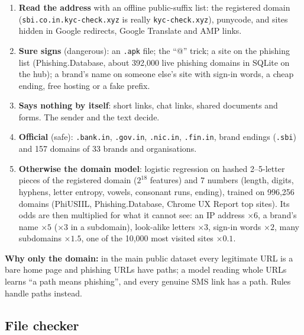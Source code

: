 \documentclass[11pt,a4paper]{article}
\newcommand{\code}[1]{\texttt{#1}}
\begin{document}
\begin{enumerate}
  \item \textbf{Read the address} with an offline public-suffix list: the registered domain
        (\code{sbi.co.in.kyc-check.xyz} is really \code{kyc-check.xyz}), punycode, and sites hidden in Google
        redirects, Google Translate and AMP links.
  \item \textbf{Sure signs} (dangerous): an \code{.apk} file; the ``@'' trick; a site on the phishing list
        (Phishing.Database, about 392,000 live phishing domains in SQLite on the hub); a brand's name on someone
        else's site with sign-in words, a cheap ending, free hosting or a fake prefix.
  \item \textbf{Says nothing by itself}: short links, chat links, shared documents and forms. The sender and the
        text decide.
  \item \textbf{Official} (safe): \code{.bank.in}, \code{.gov.in}, \code{.nic.in}, \code{.fin.in}, brand endings
        (\code{.sbi}) and 157 domains of 33 brands and organisations.
  \item \textbf{Otherwise the domain model}: logistic regression on hashed 2--5-letter pieces of the registered
        domain ($2^{18}$ features) and 7 numbers (length, digits, hyphens, letter entropy, vowels, consonant runs,
        ending), trained on 996,256 domains (PhiUSIIL, Phishing.Database, Chrome UX Report top sites). Its odds
        are then multiplied for what it cannot see: an IP address $\times 6$, a brand's name $\times 5$ ($\times 3$
        in a subdomain), look-alike letters $\times 3$, sign-in words $\times 2$, many subdomains $\times 1.5$, one
        of the 10,000 most visited sites $\times 0.1$.
\end{enumerate}

\textbf{Why only the domain:} in the main public dataset every legitimate URL is a bare home page and phishing URLs
have paths; a model reading whole URLs learns ``a path means phishing'', and every genuine SMS link has a path.
Rules handle paths instead.

\subsection{File checker}
\label{sec:files}
\end{document}
